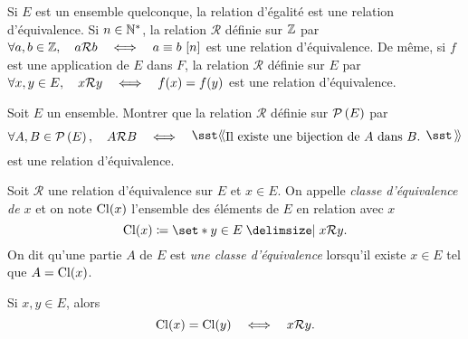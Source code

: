 \documentclass{magnoliaold}
\begin{document}
\begin{remarqueUnique}
\remarque Si $E$ est un ensemble quelconque, la relation d'égalité est une
  relation d'équivalence. Si $n\in{\mathbb{N}^*}$, la relation $\mathcal{R}$ définie sur $\mathbb{Z}$ par
  \og $\forall a,b\in\mathbb{Z} ,\quad a\mathcal{R} b \quad\Longleftrightarrow\quad a\equiv b\ [n]$ \fg
  est une relation d'équivalence. De même, si $f$ est une application
  de $E$ dans $F$, la relation $\mathcal{R}$ définie sur $E$ par
  \og $\forall x,y\in E ,\quad x\mathcal{R}y \quad\Longleftrightarrow\quad f(x)=f(y)$ \fg
  est une relation d'équivalence.
\end{remarqueUnique}

\begin{exoUnique}
\exo Soit $E$ un ensemble. Montrer que la relation $\mathcal{R}$ définie
  sur $\mathcal{P}\left(E\right)$ par
  \[\forall A,B\in\parties{E} \qsep A\mathcal{R} B \quad\ssi\quad
    \text{\og Il existe une bijection de $A$ dans $B$. \fg}\]
  est une relation d'équivalence.
\end{exoUnique}


\begin{definition}[utile=-3]
Soit $\mathcal{R}$ une relation d'équivalence sur $E$ et $x\in E$. On appelle
\emph{classe d'équivalence de $x$} et on note ${\rm Cl}(x)$ l'ensemble des
éléments de $E$ en relation avec $x$
\[{\rm Cl}(x)\defeq\enstq{y\in E}{x\mathcal{R}y}.\]
On dit qu'une partie $A$ de $E$ est \emph{une classe d'équivalence} lorsqu'il existe
$x\in E$ tel que $A={\rm Cl}(x)$.
\end{definition}

\begin{remarqueUnique}
\remarque Si $x,y\in E$, alors
  \[{\rm Cl}(x)={\rm Cl}(y) \quad\Longleftrightarrow\quad x \mathcal{R} y.\]
\end{remarqueUnique}

\end{document}
